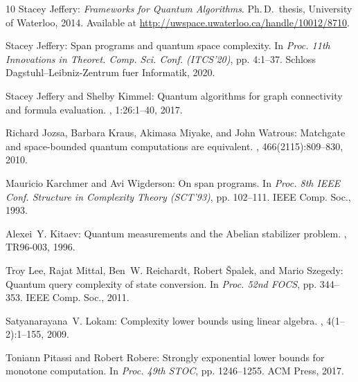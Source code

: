 \documentclass[11pt]{article}
\numberwithin{equation}{section}
\theoremstyle{definition}
\theoremstyle{plain}
\begin{document}
\begin{thebibliography}{10}
{\sc Stacey Jeffery}: {\em Frameworks for Quantum Algorithms}.
\newblock Ph.\,D.\ thesis, University of Waterloo, 2014.
\newblock Available at \url{http://uwspace.uwaterloo.ca/handle/10012/8710}.

{\sc Stacey Jeffery}: Span programs and quantum space complexity.
\newblock In {\em Proc. 11th Innovations in Theoret. Comp. Sci. Conf.
  (ITCS'20)}, pp. 4:1--37. Schloss Dagstuhl--Leibniz-Zentrum fuer Informatik,
  2020.

{\sc Stacey Jeffery and Shelby Kimmel}: Quantum algorithms for graph
  connectivity and formula evaluation.
, 1:26:1--40, 2017.

{\sc Richard Jozsa, Barbara Kraus, Akimasa Miyake, and John Watrous}: Matchgate
  and space-bounded quantum computations are equivalent.
, 466(2115):809--830, 2010.

{\sc Mauricio Karchmer and Avi Wigderson}: On span programs.
\newblock In {\em Proc. 8th IEEE Conf. Structure in Complexity Theory
  (SCT'93)}, pp. 102--111. IEEE Comp. Soc., 1993.

{\sc Alexei~Y. Kitaev}: Quantum measurements and the {A}belian stabilizer
  problem.
, TR96-003, 1996.

{\sc Troy Lee, Rajat Mittal, Ben~W. Reichardt, Robert {\v{S}}palek, and Mario
  Szegedy}: Quantum query complexity of state conversion.
\newblock In {\em Proc. 52nd FOCS}, pp. 344--353. IEEE Comp. Soc., 2011.

{\sc Satyanarayana~V. Lokam}: Complexity lower bounds using linear algebra.
, 4(1--2):1--155, 2009.
\newblock [\epfmtdoi{10.1561/0400000011}]

{\sc Toniann Pitassi and Robert Robere}: Strongly exponential lower bounds for
  monotone computation.
\newblock In {\em Proc. 49th STOC}, pp. 1246--1255. ACM Press, 2017.


\end{thebibliography}
\end{document}
